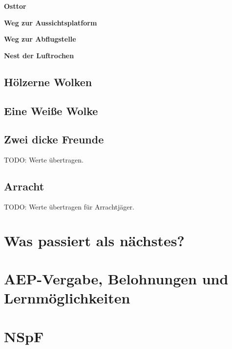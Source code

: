 \documentclass[
a4paper,
twoside,
DIV=calc,
BCOR=4mm,
fontsize=9pt,
twocolumn=on,
titlepage=on,
parskip=half
]{scrartcl}
\begin{document}
\textbf{ Osttor}


\textbf{ Weg zur Aussichtsplatform}


\textbf{ Weg zur Abflugstelle}


\textbf{ Nest der Luftrochen}



\subsection{Hölzerne Wolken}


\subsection{Eine Weiße Wolke}

\subsection{Zwei dicke Freunde}
\label{hunar}

TODO: Werte übertragen.

\subsection{Arracht}

TODO: Werte übertragen für Arrachtjäger.

\appendix

\section{Was passiert als nächstes?}




\section{AEP-Vergabe, Belohnungen und Lernmöglichkeiten}

\section{NSpF}
\end{document}
